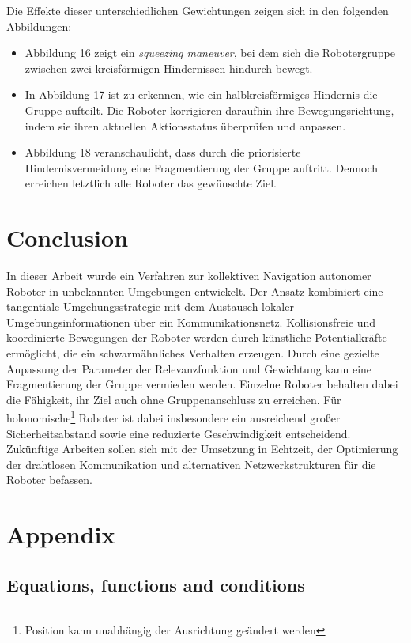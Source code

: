 \documentclass[conference]{IEEEtran}
\begin{document}
Die Effekte dieser unterschiedlichen Gewichtungen zeigen sich in den folgenden Abbildungen:
\begin{itemize}
\item Abbildung 16 zeigt ein \textit{squeezing maneuver}, bei dem sich die 
Robotergruppe zwischen zwei kreisförmigen Hindernissen hindurch bewegt.
\item In Abbildung 17 ist zu erkennen, wie ein halbkreisförmiges Hindernis 
die Gruppe aufteilt. Die Roboter korrigieren daraufhin ihre Bewegungsrichtung, 
indem sie ihren aktuellen Aktionsstatus überprüfen und anpassen.
\item Abbildung 18 veranschaulicht, dass durch die priorisierte 
Hindernisvermeidung eine Fragmentierung der Gruppe auftritt. 
Dennoch erreichen letztlich alle Roboter das gewünschte Ziel.
\end{itemize}


\section{Conclusion}
In dieser Arbeit wurde ein Verfahren zur kollektiven Navigation autonomer Roboter 
in unbekannten Umgebungen entwickelt. Der Ansatz kombiniert eine tangentiale 
Umgehungsstrategie mit dem Austausch lokaler Umgebungsinformationen über ein 
Kommunikationsnetz. Kollisionsfreie und koordinierte Bewegungen der Roboter 
werden durch künstliche Potentialkräfte ermöglicht, die ein schwarmähnliches 
Verhalten erzeugen. Durch eine gezielte Anpassung der Parameter der 
Relevanzfunktion und Gewichtung kann eine Fragmentierung der Gruppe 
vermieden werden. Einzelne Roboter behalten dabei die Fähigkeit, ihr Ziel 
auch ohne Gruppenanschluss zu erreichen. Für holonomische\footnote{Position 
kann unabhängig der Ausrichtung geändert werden} Roboter ist dabei 
insbesondere ein ausreichend großer Sicherheitsabstand sowie eine reduzierte 
Geschwindigkeit entscheidend. Zukünftige Arbeiten sollen sich mit der 
Umsetzung in Echtzeit, der Optimierung der drahtlosen Kommunikation und 
alternativen Netzwerkstrukturen für die Roboter befassen.


\section*{Appendix}
\subsection*{Equations, functions and conditions}
\end{document}
